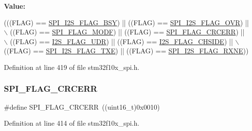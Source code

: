 {\bfseries Value\+:}
\begin{DoxyCode}
(((FLAG) == \hyperlink{group___s_p_i___i2_s__flags__definition_ga4551095df1365cf2a760282a34279b3c}{SPI\_I2S\_FLAG\_BSY}) || ((FLAG) == \hyperlink{group___s_p_i___i2_s__flags__definition_ga42001f769835f133600a021a29764254}{SPI\_I2S\_FLAG\_OVR}) || \(\backslash\)
                                   ((FLAG) == \hyperlink{group___s_p_i___i2_s__flags__definition_gac7d3525ab98cc18f02270a4dba685897}{SPI\_FLAG\_MODF}) || ((FLAG) == 
      \hyperlink{group___s_p_i___i2_s__flags__definition_ga30fb6af50e1f3c61cb9de76b0101c889}{SPI\_FLAG\_CRCERR}) || \(\backslash\)
                                   ((FLAG) == \hyperlink{group___s_p_i___i2_s__flags__definition_gaec08a8ad716bef1b87a8c8d992ab89ec}{I2S\_FLAG\_UDR}) || ((FLAG) == 
      \hyperlink{group___s_p_i___i2_s__flags__definition_gaf0d629fd522a15aff188236d3254b2ad}{I2S\_FLAG\_CHSIDE}) || \(\backslash\)
                                   ((FLAG) == \hyperlink{group___s_p_i___i2_s__flags__definition_ga4dbac2dc3e0cfbd7a019ebecc45d66d7}{SPI\_I2S\_FLAG\_TXE}) || ((FLAG) == 
      \hyperlink{group___s_p_i___i2_s__flags__definition_ga79ee46c44f8886193293528460fea6ed}{SPI\_I2S\_FLAG\_RXNE}))
\end{DoxyCode}


Definition at line 419 of file stm32f10x\+\_\+spi.\+h.

\mbox{\label{group___s_p_i___i2_s__flags__definition_ga30fb6af50e1f3c61cb9de76b0101c889}} 
\subsubsection{\texorpdfstring{S\+P\+I\+\_\+\+F\+L\+A\+G\+\_\+\+C\+R\+C\+E\+RR}{SPI\_FLAG\_CRCERR}}
{\footnotesize\ttfamily \#define S\+P\+I\+\_\+\+F\+L\+A\+G\+\_\+\+C\+R\+C\+E\+RR~((uint16\+\_\+t)0x0010)}



Definition at line 414 of file stm32f10x\+\_\+spi.\+h.

\mbox{\label{group___s_p_i___i2_s__flags__definition_gac7d3525ab98cc18f02270a4dba685897}} 
